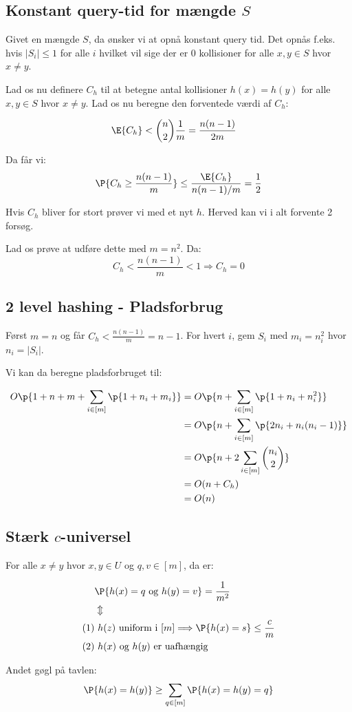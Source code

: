 \subsection{Konstant query-tid for mængde $S$}
Givet en mængde $S$, da ønsker vi at opnå konstant query tid. Det opnås f.eks. hvis $|S_i| \leq 1$ for alle $i$ hvilket vil sige der er 0 kollisioner for alle $x, y \in S$ hvor $x \neq y$.

Lad os nu definere $C_h$ til at betegne antal kollisioner $h(x) = h(y)$ for alle $x, y \in S$ hvor $x \neq y$. Lad os nu beregne den forventede værdi af $C_h$:

\begin{align}
  \E{C_h} &< \binom{n}{2} \frac{1}{m} = \frac{n(n-1)}{2m}
\end{align}


Da får vi:
$$
\P{C_h \geq \frac{n(n-1)}{m}} \leq \frac{\E{C_h}}{n(n-1)/m} = \frac{1}{2}
$$

Hvis $C_h$ bliver for stort prøver vi med et nyt $h$. Herved kan vi i alt forvente 2 forsøg.

Lad os prøve at udføre dette med $m = n^2$. Da:
$$
C_h < \frac{n(n-1)}{m} < 1 \Longrightarrow C_h = 0
$$



\subsection{2 level hashing - Pladsforbrug}

Først $m = n$ og får $C_h < \frac{n(n-1)}{m} = n-1$. For hvert $i$, gem $S_i$ med $m_i = n_i^2$ hvor $n_i = |S_i|$.

Vi kan da beregne pladsforbruget til:

\begin{align}
  O \p{ 1 + n +m + \sum_{i \in [m]} \p{ 1 + n_i + m_i }   }
  &= O \p{ n + \sum_{i \in [m]} \p{ 1 + n_i + n_i^2 }  }\\
  &= O \p{ n + \sum_{i \in [m]} \p{ 2 n_i + n_i ( n_i - 1) }  }\\
  &= O \p{ n + 2 \sum_{i \in [m]} \binom{n_i}{2} }\\
  &= O(n + C_h)\\
  &= O(n)
\end{align}

\subsection{Stærk $c$-universel}

For alle $x \neq y$ hvor $x, y \in U$ og $q, v \in [m]$, da er:

\begin{align}
  &\P{h(x) = q \text{ og } h(y) = v} = \frac{1}{m^2}\\
  &\Updownarrow \\
  (1) &\text{ $h(z)$ uniform i $[m]$} \Longrightarrow \P{h(x) = s} \leq \frac{c}{m}\\
  (2) &\text{ $h(x)$ og $h(y)$ er uafhængig}
\end{align}

Andet gøgl på tavlen:
$$
\P{h(x) = h(y)} \geq \sum_{q \in [m]} \P{h(x) = h(y) = q}
$$
